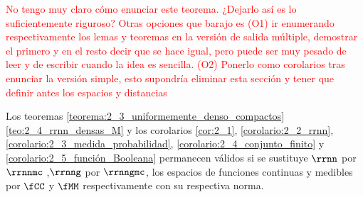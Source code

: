 \textcolor{red}{No tengo muy claro cómo enunciar este teorema. ¿Dejarlo así 
es lo suficientemente riguroso? Otras opciones que barajo es (O1) ir enumerando 
respectivamente los lemas y teoremas en la versión de salida múltiple,
 demostrar el primero y en el resto decir que se hace igual, pero puede 
 ser muy pesado de leer y de escribir cuando la idea es sencilla. 
 (O2) Ponerlo como corolarios tras enunciar la versión simple, esto supondría eliminar 
 esta sección y tener 
 que definir antes los espacios y distancias}
\begin{corolario}\label{corolario:2_6}
    Los teoremas 
    \ref{teorema:2_3_uniformemente_denso_compactos}
    \ref{teo:2_4_rrnn_densas_M} 
    y los corolarios
    \ref{cor:2_1}, 
    \ref{corolario:2_2_rrnn},
    \ref{corolario:2_3_medida_probabilidad},
    \ref{corolario:2_4_conjunto_finito}
    y 
    \ref{corolario:2_5_función_Booleana}
    permanecen válidos si se sustituye $\rrnn$ por $\rrnnmc$
    ,$\rrnng$ por $\rrnngmc$, 
    los espacios de funciones continuas y medibles por $\fCC$ y $\fMM$ respectivamente con su respectiva norma.
\end{corolario}
